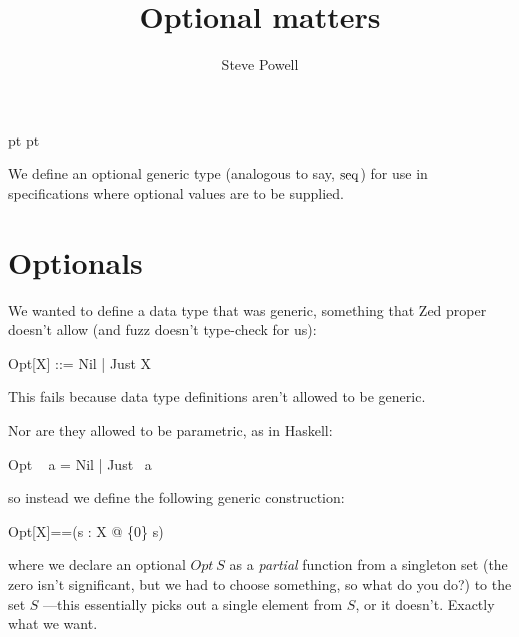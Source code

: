 \documentclass[a4paper,titlepage,twoside,12pt]{article}
\begin{document}
 pt
 pt

\title{Optional matters}
\author{Steve Powell}
\maketitle
\thispagestyle{myheadings}
\setcounter{page}{0}

We define an optional generic type (analogous to say, $\mathop{\mathrm{seq}}$) for use in specifications where optional values are to be supplied.



\newcommand{\true}{true}
\newcommand{\false}{false}
\renewcommand{\emptyset}{\varnothing}
\newcommand{\defaultsTo}{\mathbin{\sf defaultsTo}}

\clearpage
\tableofcontents

\clearpage
{}

\section{Optionals}
We wanted to define a data type that was generic, something that Zed proper doesn't allow  (and fuzz doesn't type-check for us):

\begin{zed}
	Opt[X] ::= Nil | Just \ldata X \rdata
\end{zed}
This fails because data type definitions aren't allowed to be generic.

Nor are they allowed to be parametric, as in Haskell:
\begin{zed}
	 Opt ~ a = Nil | Just ~a
\end{zed}
so instead we define the following generic construction:
\begin{zed}
	Opt[X]==(\lambda s : \power X @ \{0\} \pfun s)
\end{zed}
where we declare an optional $Opt ~ S$ as a \emph{partial} function from a singleton set (the zero isn't significant, but we had to choose something, so what do you do?) to the set $S$ ---this essentially picks out a single element from $S$, or it doesn't. Exactly what we want.
\end{document}
